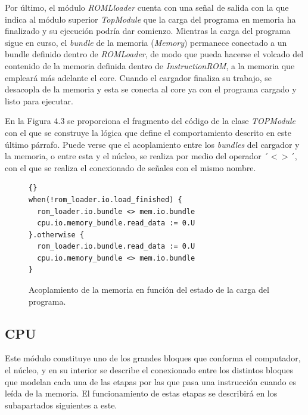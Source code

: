 Por último, el módulo \textit{ROMLloader} cuenta con una señal de salida con la que indica al módulo superior \textit{TopModule} que la carga del programa en memoria ha finalizado y su ejecución podría dar comienzo. Mientras la carga del programa sigue en curso, el \textit{bundle} de la memoria (\textit{Memory}) permanece conectado a un bundle definido dentro de \textit{ROMLoader}, de modo que pueda hacerse el volcado del contenido de la memoria definida dentro de \textit{InstructionROM}, a la memoria que empleará más adelante el core. Cuando el cargador finaliza su trabajo, se desacopla de la memoria y esta se conecta al core ya con el programa cargado y listo para ejecutar.

En la Figura 4.3 se proporciona el fragmento del código de la clase \textit{TOPModule} con el que se construye la lógica que define el comportamiento descrito en este último párrafo. Puede verse que el acoplamiento entre los \textit{bundles} del cargador y la memoria, o entre esta y el núcleo, se realiza por medio del operador ´$<>$´, con el que se realiza el conexionado de señales con el mismo nombre.

\vspace{+0.8cm}
\begin{figure}[h!!]
\centering
\begin{minipage}{0.9\linewidth}
\begin{lstlisting}[style=scalaStyle]{}
when(!rom_loader.io.load_finished) {
  rom_loader.io.bundle <> mem.io.bundle
  cpu.io.memory_bundle.read_data := 0.U
}.otherwise {
  rom_loader.io.bundle.read_data := 0.U
  cpu.io.memory_bundle <> mem.io.bundle
}
\end{lstlisting}
\vspace{-0.1cm}
\caption{Acoplamiento de la memoria en función del estado de la carga del programa.}
\end{minipage}
\end{figure}

\subsection{CPU}

Este módulo constituye uno de los grandes bloques que conforma el computador, el núcleo, y en su interior se describe el conexionado entre los distintos bloques que modelan cada una de las etapas por las que pasa una instrucción cuando es leída de la memoria. El funcionamiento de estas etapas se describirá en los subapartados siguientes a este.

